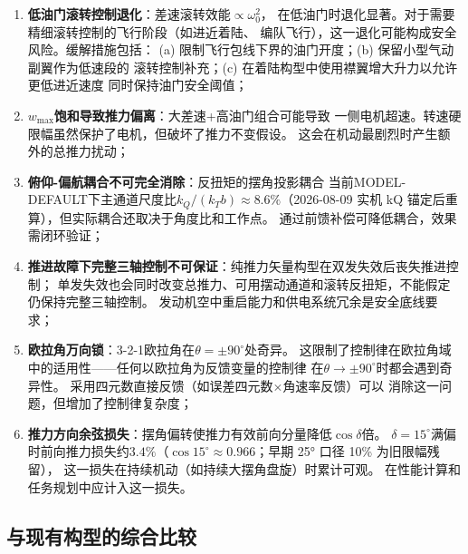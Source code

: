 \begin{enumerate}[label=(\arabic*)]
    \item \textbf{低油门滚转控制退化}：差速滚转效能$\propto \omega_0^2$，
          在低油门时退化显著。对于需要精细滚转控制的飞行阶段（如进近着陆、
          编队飞行），这一退化可能构成安全风险。缓解措施包括：
          (a) 限制飞行包线下界的油门开度；(b) 保留小型气动副翼作为低速段的
          滚转控制补充；(c) 在着陆构型中使用襟翼增大升力以允许更低进近速度
          同时保持油门安全阈值；
    \item \textbf{$w_{\max}$饱和导致推力偏离}：大差速+高油门组合可能导致
          一侧电机超速。转速硬限幅虽然保护了电机，但破坏了推力不变假设。
          这会在机动最剧烈时产生额外的总推力扰动；
    \item \textbf{俯仰-偏航耦合不可完全消除}：反扭矩的摆角投影耦合
          当前MODEL-DEFAULT下主通道尺度比$k_Q/(k_Tb)\approx8.6\%$（2026-08-09 实机 kQ 锚定后重算），但实际耦合还取决于角度比和工作点。
          通过前馈补偿可降低耦合，效果需闭环验证；
    \item \textbf{推进故障下完整三轴控制不可保证}：纯推力矢量构型在双发失效后丧失推进控制；
          单发失效也会同时改变总推力、可用摆动通道和滚转反扭矩，不能假定仍保持完整三轴控制。
          发动机空中重启能力和供电系统冗余是安全底线要求；
    \item \textbf{欧拉角万向锁}：3-2-1欧拉角在$\theta = \pm 90^\circ$处奇异。
          这限制了控制律在欧拉角域中的适用性——任何以欧拉角为反馈变量的控制律
          在$\theta \to \pm 90^\circ$时都会遇到奇异性。
          采用四元数直接反馈（如误差四元数$\times$角速率反馈）可以
          消除这一问题\cite{markley2014fundamentals}，但增加了控制律复杂度；
    \item \textbf{推力方向余弦损失}：摆角偏转使推力有效前向分量降低$\cos\delta$倍。
          $\delta = 15^\circ$满偏时前向推力损失约$3.4\%$（$\cos 15^\circ \approx 0.966$；早期 25° 口径 10\% 为旧限幅残留），
          这一损失在持续机动（如持续大摆角盘旋）时累计可观。
          在性能计算和任务规划中应计入这一损失。
\end{enumerate}

\subsection{与现有构型的综合比较}

